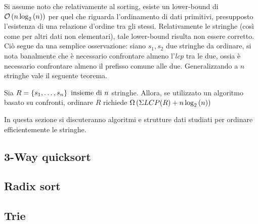 \documentclass{subfiles}
\begin{document}
Si assume noto che relativamente al sorting, esiste un lower-bound di \(\OrderOf{n \Log{n}[2]}\) per quel che riguarda l'ordinamento di dati primitivi,
presupposto l'esistenza di una relazione d'ordine tra gli stessi.
Relativamente le stringhe (così come per altri dati non elementari), tale lower-bound risulta non essere corretto.
Ciò segue da una semplice osservazione: siano \(s_1, s_2\) due stringhe da ordinare, si nota banalmente che è necessario confrontare almeno l'\emph{lcp} tra le due,
ossia è necessario confrontare almeno il prefisso comune alle due. Generalizzando a \(n\) stringhe vale il seguente teorema.
\begin{Theorem}
    Sia \(R = \Set{\List{s}{1}{n}} \text{insieme di} n\) stringhe.
    Allora, se utilizzato un algoritmo basato su confronti, ordinare \(R\) richiede \(\OmegaOf{\Sigma LCP(R) + n \Log{n}[2]}\)
\end{Theorem}

In questa sezione si discuteranno algoritmi e strutture dati studiati per ordinare efficientemente le stringhe.

\subsection{3-Way quicksort}


\subsection{Radix sort}


\subsection{Trie}

\end{document}
